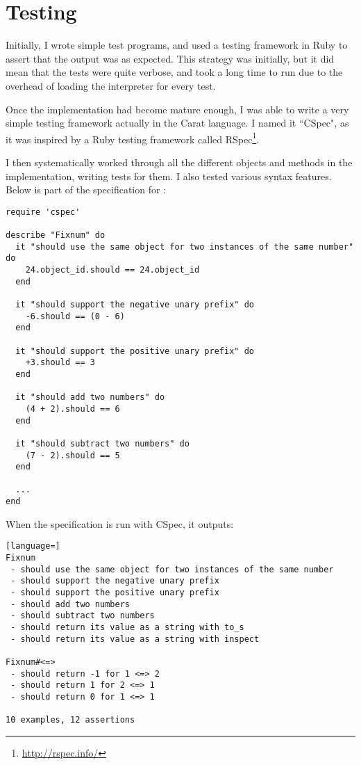 \section{Testing}

Initially, I wrote simple test programs, and used a testing framework in Ruby to assert that the output was as expected. This strategy was initially, but it did mean that the tests were quite verbose, and took a long time to run due to the overhead of loading the interpreter for every test.

Once the implementation had become mature enough, I was able to write a very simple testing framework actually in the Carat language. I named it ``CSpec", as it was inspired by a Ruby testing framework called RSpec\footnote{\url{http://rspec.info/}}.

I then systematically worked through all the different objects and methods in the implementation, writing tests for them. I also tested various syntax features. Below is part of the specification for :

\begin{lstlisting}
require 'cspec'

describe "Fixnum" do
  it "should use the same object for two instances of the same number" do
    24.object_id.should == 24.object_id
  end
  
  it "should support the negative unary prefix" do
    -6.should == (0 - 6)
  end
  
  it "should support the positive unary prefix" do
    +3.should == 3
  end
  
  it "should add two numbers" do
    (4 + 2).should == 6
  end
  
  it "should subtract two numbers" do
    (7 - 2).should == 5
  end
  
  ...
end
\end{lstlisting}

When the  specification is run with CSpec, it outputs:

\begin{minipage}{\textwidth}
\begin{lstlisting}[language=]
Fixnum
 - should use the same object for two instances of the same number
 - should support the negative unary prefix
 - should support the positive unary prefix
 - should add two numbers
 - should subtract two numbers
 - should return its value as a string with to_s
 - should return its value as a string with inspect

Fixnum#<=>
 - should return -1 for 1 <=> 2
 - should return 1 for 2 <=> 1
 - should return 0 for 1 <=> 1

10 examples, 12 assertions
\end{lstlisting}
\end{minipage}


